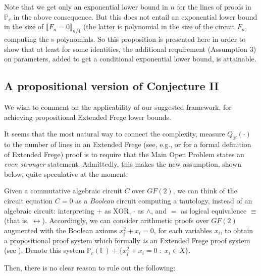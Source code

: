 \documentclass[12pt,reqno]{article}
\newcommand\F{\ensuremath{\mathbb F}}
\newcommand\PP{{\mathbb P}}
\newcommand\PC{\ensuremath{\PP_c}}
\newcommand{\cd}{\cdot}
\begin{document}
Note that we get only an exponential lower bound in \(n\) for the lines of proofs in $\PC$ in the above consequence. But this does not entail an exponential lower bound in the size of  $\llbracket F_n= 0\rrbracket_{n/4}$ (the latter is polynomial in the size of the circuit \(F_{n}\), computing the s-polynomials. So this proposition is presented here in order to show that at least for some identities, the additional requirement (Assumption 3) on parameters, added to get a conditional  exponential lower bound, is attainable.


\subsection{A propositional version of Conjecture II}\label{sec:prop-vers}
We wish to comment on  the applicability of our suggested framework, for achieving propositional Extended Frege lower bounds.


It seems that the most natural way to connect the complexity, measure  \(Q_{\mathcal B}(\cd)\) to the number of
lines in an Extended Frege  (see, e.g., \cite{Kra95} or \cite{Jer04} for a formal definition of Extended Frege) proof is to require that the Main Open Problem states an \textit{even stronger} statement. Admittedly, this makes the new assumption, shown below,  quite speculative at the moment.

Given a commutative algebraic circuit $C$ over $GF(2)$, we can think of the circuit equation $C=0$ as a \emph{Boolean} circuit computing a tautology, instead of an algebraic circuit: interpreting $+$ as XOR, $\cd$ as $\land$, and $=$ as logical equivalence $\equiv$ (that is, $\leftrightarrow$).    Accordingly, we can consider arithmetic proofs over $GF(2)$ augmented with the Boolean axioms $x^2_i+x_i=0$, for each variables $x_i$, to obtain a propositional proof system which formally \textit{is} an Extended Frege proof system (see \cite{HT12}). Denote this system
$\PC(\F)+\{x_i^2+x_i=0\;:\;x_i\in X\}$.

Then, there is no clear reason to rule out the following:

\newtheorem*{prop-main-open}{Conjecture 1 for the propositional case over $GF(2)$}
\end{document}
